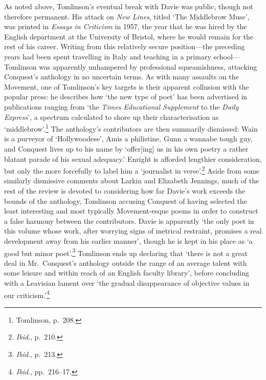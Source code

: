 \documentclass[]{article}
\begin{document}
As noted above, Tomlinson's eventual break with Davie was public, though
not therefore permanent. His attack on \emph{New Lines}, titled `The
Middlebrow Muse', was printed in \emph{Essays in Criticism} in 1957, the
year that he was hired by the English department at the University of
Bristol, where he would remain for the rest of his career. Writing from
this relatively secure position---the preceding years had been spent
travelling in Italy and teaching in a primary school---Tomlinson was
apparently unhampered by professional squeamishness, attacking
Conquest's anthology in no uncertain terms. As with many assaults on the
Movement, one of Tomlinson's key targets is their apparent collusion
with the popular press: he describes how `the new type of poet' has been
advertised in publications ranging from `the \emph{Times Educational
Supplement} to the \emph{Daily Express}', a spectrum calculated to shore
up their characterisation as `middlebrow'.\footnote{Tomlinson, p.~208.}
The anthology's contributors are then summarily dismissed: Wain is a
purveyor of `Hollywoodese', Amis a philistine, Gunn a wannabe tough guy,
and Conquest lives up to his name by `offer{[}ing{]} us in his own
poetry a rather blatant parade of his sexual adequacy.' Enright is
afforded lengthier consideration, but only the more forcefully to label
him a `journalist in verse'.\footnote{\emph{Ibid}., p.~210.} Aside from
some similarly dismissive comments about Larkin and Elizabeth Jennings,
much of the rest of the review is devoted to considering how far Davie's
work exceeds the bounds of the anthology, Tomlinson accusing Conquest of
having selected the least interesting and most typically Movement-esque
poems in order to construct a false harmony between the contributors.
Davie is apparently `the only poet in this volume whose work, after
worrying signs of metrical restraint, promises a real development away
from his earlier manner', though he is kept in his place as `a good but
minor poet'.\footnote{\emph{Ibid}., p.~213.} Tomlinson ends up declaring
that `there is not a great deal in Mr.~Conquest's anthology outside the
range of an average talent with some leisure and within reach of an
English faculty library', before concluding with a Leavisian lament over
`the gradual disappearance of objective values in our
criticism.'\footnote{\emph{Ibid}., pp.~216--17.}
\end{document}
